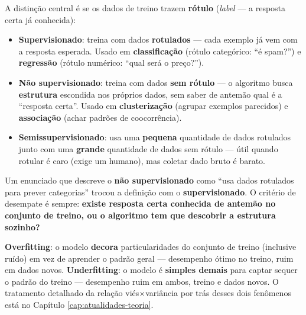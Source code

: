 \begin{conceito}
A distinção central é se os dados de treino trazem \textbf{rótulo}
(\textit{label} --- a resposta certa já conhecida):
\begin{itemize}
\item \textbf{Supervisionado}: treina com dados \textbf{rotulados} ---
cada exemplo já vem com a resposta esperada. Usado em
\textbf{classificação} (rótulo categórico: “é spam?”) e \textbf{regressão}
(rótulo numérico: “qual será o preço?”).
\item \textbf{Não supervisionado}: treina com dados \textbf{sem
rótulo} --- o algoritmo busca \textbf{estrutura} escondida nos próprios
dados, sem saber de antemão qual é a “resposta certa”. Usado em
\textbf{clusterização} (agrupar exemplos parecidos) e \textbf{associação}
(achar padrões de coocorrência).
\item \textbf{Semissupervisionado}: usa uma \textbf{pequena} quantidade de
dados rotulados junto com uma \textbf{grande} quantidade de dados sem
rótulo --- útil quando rotular é caro (exige um humano), mas coletar dado
bruto é barato.
\end{itemize}
\end{conceito}

\begin{cuidado}
Um enunciado que descreve o \textbf{não supervisionado} como “usa dados
rotulados para prever categorias” trocou a definição com o
\textbf{supervisionado}. O critério de desempate é sempre: \textbf{existe
resposta certa conhecida de antemão no conjunto de treino, ou o algoritmo
tem que descobrir a estrutura sozinho?}
\end{cuidado}

\begin{conceito}
\textbf{Overfitting}: o modelo \textbf{decora} particularidades do
conjunto de treino (inclusive ruído) em vez de aprender o padrão geral ---
desempenho ótimo no treino, ruim em dados novos. \textbf{Underfitting}: o
modelo é \textbf{simples demais} para captar sequer o padrão do treino ---
desempenho ruim em ambos, treino e dados novos. O tratamento detalhado da
relação viés$\times$variância por trás desses dois fenômenos está no
Capítulo \ref{cap:atualidades-teoria}.
\end{conceito}

